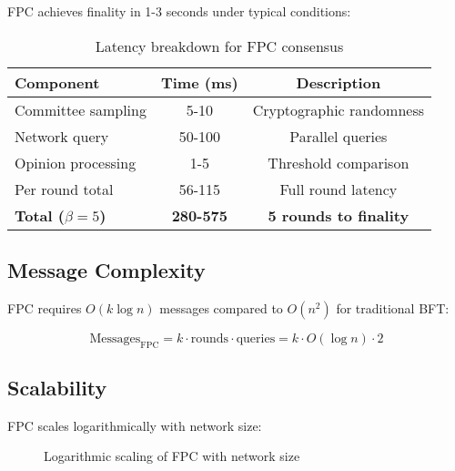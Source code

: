 \documentclass[11pt,a4paper]{article}
\begin{document}
FPC achieves finality in 1-3 seconds under typical conditions:

\begin{table}[h]
\centering
\begin{tabular}{lcc}
\toprule
\textbf{Component} & \textbf{Time (ms)} & \textbf{Description} \\
\midrule
Committee sampling & 5-10 & Cryptographic randomness \\
Network query & 50-100 & Parallel queries \\
Opinion processing & 1-5 & Threshold comparison \\
Per round total & 56-115 & Full round latency \\
\midrule
\textbf{Total ($\beta=5$)} & \textbf{280-575} & \textbf{5 rounds to finality} \\
\bottomrule
\end{tabular}
\caption{Latency breakdown for FPC consensus}
\label{tab:latency}
\end{table}

\subsection{Message Complexity}

FPC requires $O(k \log n)$ messages compared to $O(n^2)$ for traditional BFT:

\begin{equation}
\text{Messages}_{\text{FPC}} = k \cdot \text{rounds} \cdot \text{queries} = k \cdot O(\log n) \cdot 2
\end{equation}

\subsection{Scalability}

FPC scales logarithmically with network size:

\begin{figure}[h]
\centering
{}
\caption{Logarithmic scaling of FPC with network size}
\label{fig:scaling}
\end{figure}
\end{document}
